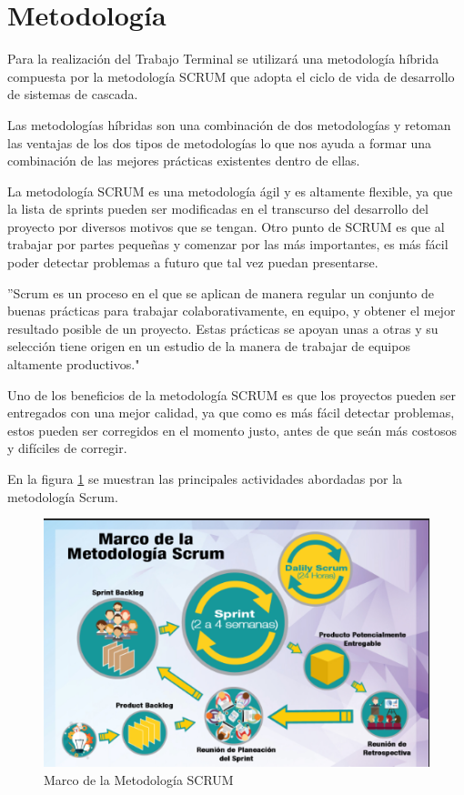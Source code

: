 \section{Metodología}
Para la realización del Trabajo Terminal se utilizará una metodología híbrida compuesta por la metodología SCRUM que adopta el ciclo de vida de desarrollo de sistemas de cascada.

Las metodologías híbridas son una combinación de dos metodologías y retoman las ventajas de los dos tipos de metodologías lo que nos ayuda a formar una combinación de las mejores prácticas existentes dentro de ellas.

La metodología SCRUM es una metodología ágil y es altamente flexible, ya que la lista de sprints pueden ser modificadas en el transcurso del desarrollo del proyecto por diversos motivos que se tengan. Otro punto de SCRUM es que al trabajar por partes pequeñas y comenzar por las más importantes, es más fácil poder detectar problemas a futuro que tal vez puedan presentarse\cite{Referencia17}.

''Scrum es un proceso en el que se aplican de manera regular un conjunto de buenas prácticas para trabajar colaborativamente, en equipo, y obtener el mejor resultado posible de un proyecto. Estas prácticas se apoyan unas a otras y su selección tiene origen en un estudio de la manera de trabajar de equipos altamente productivos."\cite{Referencia18}

Uno de los beneficios de la metodología SCRUM es que los proyectos pueden ser entregados con una mejor calidad, ya que como es más fácil detectar problemas, estos pueden ser corregidos en el momento justo, antes de que seán más costosos y difíciles de corregir. 

En la figura \ref{fig:metodologiaSCRUM} se muestran las principales actividades abordadas por la metodología Scrum.

\begin{figure}[htb]
	\centering
	\includegraphics[width=1\textwidth]{images/introduccion/scrum}
	\caption{Marco de la Metodología SCRUM} \label{fig:metodologiaSCRUM}
\end{figure}

